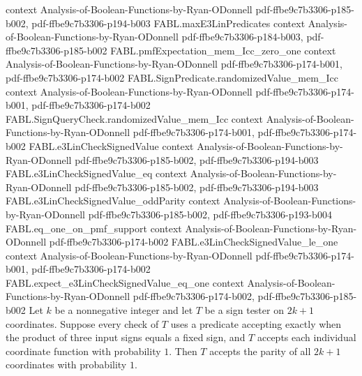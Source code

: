 \begin{theorem}
  {context}
  {Analysis-of-Boolean-Functions-by-Ryan-ODonnell}
  {pdf-ffbe9c7b3306-p185-b002,
    pdf-ffbe9c7b3306-p194-b003}
\proofstep
  {FABL.maxE3LinPredicates}
  {context}
  {Analysis-of-Boolean-Functions-by-Ryan-ODonnell}
  {pdf-ffbe9c7b3306-p184-b003,
    pdf-ffbe9c7b3306-p185-b002}
\proofstep
  {FABL.pmfExpectation_mem_Icc_zero_one}
  {context}
  {Analysis-of-Boolean-Functions-by-Ryan-ODonnell}
  {pdf-ffbe9c7b3306-p174-b001,
    pdf-ffbe9c7b3306-p174-b002}
\proofstep
  {FABL.SignPredicate.randomizedValue_mem_Icc}
  {context}
  {Analysis-of-Boolean-Functions-by-Ryan-ODonnell}
  {pdf-ffbe9c7b3306-p174-b001,
    pdf-ffbe9c7b3306-p174-b002}
\proofstep
  {FABL.SignQueryCheck.randomizedValue_mem_Icc}
  {context}
  {Analysis-of-Boolean-Functions-by-Ryan-ODonnell}
  {pdf-ffbe9c7b3306-p174-b001,
    pdf-ffbe9c7b3306-p174-b002}
\proofstep
  {FABL.e3LinCheckSignedValue}
  {context}
  {Analysis-of-Boolean-Functions-by-Ryan-ODonnell}
  {pdf-ffbe9c7b3306-p185-b002,
    pdf-ffbe9c7b3306-p194-b003}
\proofstep
  {FABL.e3LinCheckSignedValue_eq}
  {context}
  {Analysis-of-Boolean-Functions-by-Ryan-ODonnell}
  {pdf-ffbe9c7b3306-p185-b002,
    pdf-ffbe9c7b3306-p194-b003}
\proofstep
  {FABL.e3LinCheckSignedValue_oddParity}
  {context}
  {Analysis-of-Boolean-Functions-by-Ryan-ODonnell}
  {pdf-ffbe9c7b3306-p185-b002,
    pdf-ffbe9c7b3306-p193-b004}
\proofstep
  {FABL.eq_one_on_pmf_support}
  {context}
  {Analysis-of-Boolean-Functions-by-Ryan-ODonnell}
  {pdf-ffbe9c7b3306-p174-b002}
\proofstep
  {FABL.e3LinCheckSignedValue_le_one}
  {context}
  {Analysis-of-Boolean-Functions-by-Ryan-ODonnell}
  {pdf-ffbe9c7b3306-p174-b001,
    pdf-ffbe9c7b3306-p174-b002}
\proofstep
  {FABL.expect_e3LinCheckSignedValue_eq_one}
  {context}
  {Analysis-of-Boolean-Functions-by-Ryan-ODonnell}
  {pdf-ffbe9c7b3306-p174-b002,
    pdf-ffbe9c7b3306-p185-b002}
Let $k$ be a nonnegative integer and let $T$ be a sign tester on $2k+1$ coordinates.
Suppose every check of $T$ uses a predicate accepting exactly when the product of three
input signs equals a fixed sign, and $T$ accepts each individual coordinate function
with probability $1$. Then $T$ accepts the parity of all $2k+1$ coordinates with
probability $1$.
\end{theorem}

